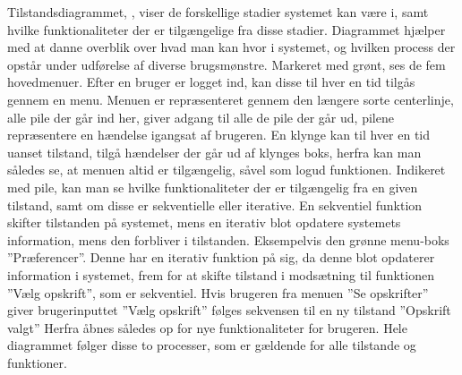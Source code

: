 Tilstandsdiagrammet, , viser de forskellige stadier systemet kan være i, samt hvilke funktionaliteter der er tilgængelige fra disse stadier.
Diagrammet hjælper med at danne overblik over hvad man kan hvor i systemet, og hvilken process der opstår under udførelse af diverse brugsmønstre.
Markeret med grønt, ses de fem hovedmenuer.
Efter en bruger er logget ind, kan disse til hver en tid tilgås gennem en menu.
Menuen er repræsenteret gennem den længere sorte centerlinje,  alle pile der går ind her, giver adgang til alle de pile der går ud, pilene repræsentere en hændelse igangsat af brugeren.
En klynge kan  til hver en tid uanset tilstand, tilgå hændelser der går ud af klynges boks, herfra kan man således se, at menuen altid er tilgængelig, såvel som logud funktionen.
Indikeret med pile, kan man se hvilke funktionaliteter der er tilgængelig fra en given tilstand, samt om disse er sekventielle eller iterative.
En sekventiel funktion skifter tilstanden på systemet, mens en iterativ blot opdatere systemets information, mens den forbliver i tilstanden.
Eksempelvis den grønne menu-boks ''Præferencer''.
Denne har en iterativ funktion på sig, da denne blot opdaterer information i systemet, frem for at skifte tilstand i modsætning til funktionen ''Vælg opskrift'', som er sekventiel.
Hvis brugeren fra menuen ''Se opskrifter'' giver brugerinputtet ''Vælg opskrift'' følges sekvensen til en ny tilstand ''Opskrift valgt'' Herfra åbnes således op for nye funktionaliteter for brugeren.
Hele diagrammet følger disse to processer, som er gældende for alle tilstande og funktioner.\label{tdiabeskriv}
